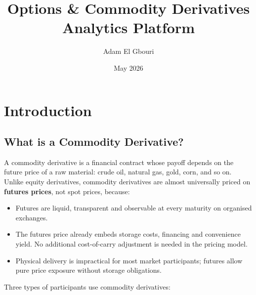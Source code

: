 \documentclass[11pt,a4paper]{article}
\title{Options \& Commodity Derivatives Analytics Platform}
\author{Adam El Gbouri}
\date{May 2026}
\begin{document}
\maketitle

\section{Introduction}

\subsection{What is a Commodity Derivative?}

A commodity derivative is a financial contract whose payoff depends on the
future price of a raw material: crude oil, natural gas, gold, corn, and so on.
Unlike equity derivatives, commodity derivatives are almost universally priced on
\textbf{futures prices}, not spot prices, because:

\begin{itemize}[itemsep=3pt]
\item Futures are liquid, transparent and observable at every maturity on organised exchanges.
\item The futures price already embeds storage costs, financing and convenience yield. No additional cost-of-carry adjustment is needed in the pricing model.
\item Physical delivery is impractical for most market participants; futures allow pure price exposure without storage obligations.
\end{itemize}

Three types of participants use commodity derivatives:

\medskip
\begin{center}
\end{center}
\end{document}
